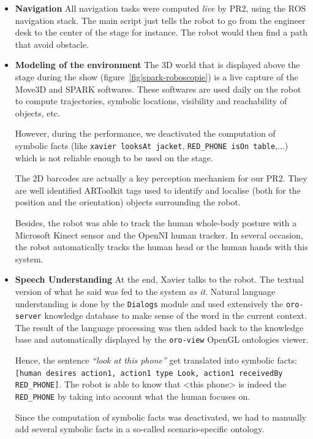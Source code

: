 \begin{itemize}
    \item{\bf Navigation} All navigation tasks were computed \emph{live} by
PR2, using the ROS navigation stack. The main script just tells the robot to go
from the engineer desk to the center of the stage for instance. The robot would
then find a path that avoid obstacle.  

    \item{\bf Modeling of the environment} The 3D world that is displayed above the stage
during the show (figure~\ref{fig|spark-roboscopie}) is a live capture of the
Move3D and SPARK softwares. These softwares are used daily on the robot to
compute trajectories, symbolic locations, visibility and reachability of
objects, etc.

However, during the performance, we deactivated the computation of symbolic
facts (like {\tt xavier looksAt jacket}, {\tt RED\_PHONE isOn table},...) which
is not reliable enough to be used on the stage.

The 2D barcodes are actually a key perception mechanism for our PR2. They are
well identified {\sc ARToolkit} tags used to identify and localise (both for the
position and the orientation) objects surrounding the robot.

Besides, the robot was able to track the human whole-body posture with a
Microsoft Kinect sensor and the {\sc OpenNI} human tracker. In several
occasion, the robot automatically tracks the human head or the human hands with
this system.

    \item{\bf Speech Understanding} At the end, Xavier talks to the robot. The
textual version of what he said was fed to the system \emph{as it}. Natural
language understanding is done by the {\tt Dialogs}
module and used extensively the {\tt oro-server} knowledge
database to make sense of the word in the current context. The result of the
language processing was then added back to the knowledge base and automatically
displayed by the {\tt oro-view} OpenGL ontologies viewer.

Hence, the sentence \emph{``look at this phone''} get translated into symbolic
facts: {\tt [human desires action1, action1 type Look, action1 receivedBy
RED\_PHONE]}. The robot is able to know that <this phone> is indeed the {\tt
RED\_PHONE} by taking into account what the human focuses on.

Since the computation of symbolic facts was deactivated, we had to manually add
several symbolic facts in a so-called scenario-specific ontology.

\end{itemize}

